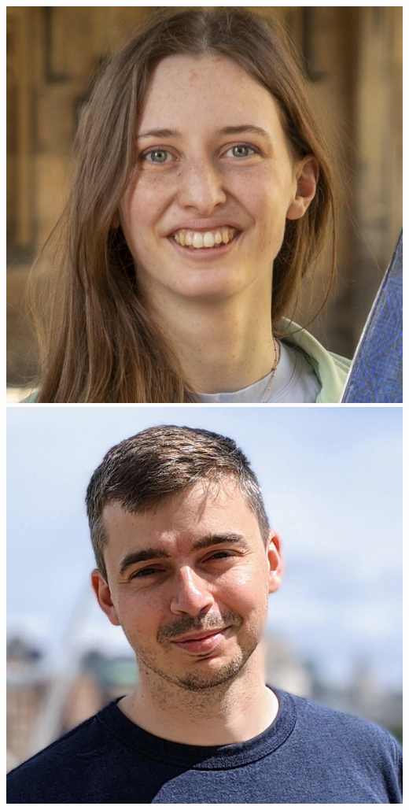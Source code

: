 \documentclass[aspectratio=169]{beamer}
\begin{document}
\begin{frame}
{        \includegraphics[width=0.09\textheight]{people/charlotte_priestley.jpg}%
        \includegraphics[width=0.09\textheight]{people/david_yallup.jpg}%
}
\end{frame}
\end{document}
